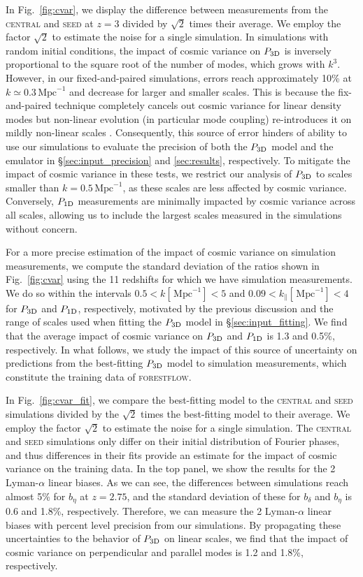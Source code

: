 \documentclass[fleqn,usenatbib]{mnras}
\newcommand{\lya}{Lyman-$\alpha$\xspace}
\newcommand{\poned}{\ensuremath{P_{\rm 1D}}\xspace}
\newcommand{\pthreed}{\ensuremath{P_{\rm 3D}}\xspace}
\newcommand{\forestflow}{\textsc{forestflow}\xspace}
\newcommand{\simseed}{\textsc{seed}\xspace}
\newcommand{\simcentral}{\textsc{central}\xspace}
\newcommand{\iMpc}{\ensuremath{\,\mathrm{Mpc}^{-1}}}
\begin{document}
In Fig.~\ref{fig:cvar}, we display the difference between measurements from the \simcentral and \simseed at $z=3$ divided by $\sqrt{2}$ times their average. We employ the factor $\sqrt{2}$ to estimate the noise for a single simulation. In simulations with random initial conditions, the impact of cosmic variance on \pthreed is inversely proportional to the square root of the number of modes, which grows with $k^3$. However, in our fixed-and-paired simulations, errors reach approximately 10\% at $k\simeq0.3\iMpc$ and decrease for larger and smaller scales. This is because the fix-and-paired technique completely cancels out cosmic variance for linear density modes but non-linear evolution (in particular mode coupling) re-introduces it on mildly non-linear scales \citep{maion2022fpvariance}. Consequently, this source of error hinders of ability to use our simulations to evaluate the precision of both the \pthreed model and the emulator in \S\ref{sec:input_precision} and \ref{sec:results}, respectively. To mitigate the impact of cosmic variance in these tests, we restrict our analysis of \pthreed to scales smaller than $k=0.5\iMpc$, as these scales are less affected by cosmic variance. Conversely, \poned measurements are minimally impacted by cosmic variance across all scales, allowing us to include the largest scales measured in the simulations without concern.

For a more precise estimation of the impact of cosmic variance on simulation measurements, we compute the standard deviation of the ratios shown in Fig.~\ref{fig:cvar} using the 11 redshifts for which we have simulation measurements. We do so within the intervals $0.5<k[\iMpc]<5$ and $0.09<k_\parallel[\iMpc]<4$ for \pthreed and \poned, respectively, motivated by the previous discussion and the range of scales used when fitting the \pthreed model in \S\ref{sec:input_fitting}. We find that the average impact of cosmic variance on \pthreed and \poned is 1.3 and 0.5\%, respectively. In what follows, we study the impact of this source of uncertainty on predictions from the best-fitting \pthreed model to simulation measurements, which constitute the training data of \forestflow.

In Fig.~\ref{fig:cvar_fit}, we compare the best-fitting model to the \simcentral and \simseed simulations divided by the $\sqrt{2}$ times the best-fitting model to their average. We employ the factor $\sqrt{2}$ to estimate the noise for a single simulation. The \simcentral and \simseed simulations only differ on their initial distribution of Fourier phases, and thus differences in their fits provide an estimate for the impact of cosmic variance on the training data. In the top panel, we show the results for the 2 \lya linear biases. As we can see, the differences between simulations reach almost 5\% for $b_\eta$ at $z=2.75$, and the standard deviation of these for $b_\delta$ and $b_\eta$ is 0.6 and 1.8\%, respectively. Therefore, we can measure the 2 \lya linear biases with percent level precision from our simulations. By propagating these uncertainties to the behavior of \pthreed on linear scales, we find that the impact of cosmic variance on perpendicular and parallel modes is 1.2 and 1.8\%, respectively. 
\end{document}

